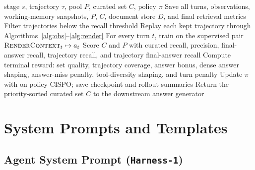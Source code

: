\documentclass{article}
\newcommand{\sys}{\texttt{Harness-1}\xspace}
\begin{document}
\begin{algorithm}[t]
\caption{Stage-specific finalizers.}
\label{alg:stages}
\small
\begin{algorithmic}[1]
\REQUIRE stage $s$, trajectory $\tau$, pool $P$, curated set $C$, policy $\pi$
  \STATE Save all turns, observations, working-memory snapshots, $P$, $C$, document store $D$, and final retrieval metrics
  \STATE Filter trajectories below the recall threshold
  \STATE Replay each kept trajectory through Algorithms~\ref{alg:obs}--\ref{alg:render}
  \STATE For every turn $t$, train on the supervised pair $\textsc{RenderContext}_t\mapsto a_t$
  \STATE Score $C$ and $P$ with curated recall, precision, final-answer recall, trajectory recall, and trajectory final-answer recall
  \STATE Compute terminal reward: set quality, trajectory coverage, answer bonus, dense answer shaping, answer-miss penalty, tool-diversity shaping, and turn penalty
  \STATE Update $\pi$ with on-policy CISPO; save checkpoint and rollout summaries
  \STATE Return the priority-sorted curated set $C$ to the downstream answer generator
\ENDIF
\end{algorithmic}
\end{algorithm}

\section{System Prompts and Templates}
\label{app:prompts}

\subsection{Agent System Prompt (\sys)}
\label{app:syspr-h1}
\end{document}

